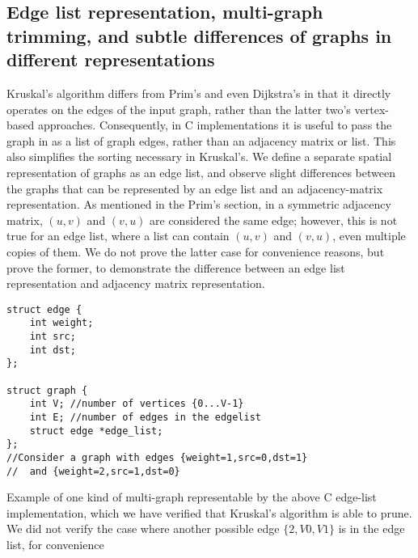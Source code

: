 \subsection{Edge list representation, multi-graph trimming, and subtle differences of graphs in different representations}
Kruskal's algorithm differs from Prim's and even Dijkstra's in that it directly operates on the edges of the input graph, rather than the latter two's vertex-based approaches. Consequently, in C implementations it is useful to pass the graph in as a list of graph edges, rather than an adjacency matrix or list. This also simplifies the sorting necessary in Kruskal's.
\newline\newline
We define a separate spatial representation of graphs as an edge list, and observe slight differences between the graphs that can be represented by an edge list and an adjacency-matrix representation. As mentioned in the Prim's section, in a symmetric adjacency matrix, $(u,v)$ and $(v,u)$ are considered the same edge; however, this is not true for an edge list, where a list can contain $(u,v)$ and $(v,u)$, even multiple copies of them. We do not prove the latter case for convenience reasons, but prove the former, to demonstrate the difference between an edge list representation and adjacency matrix representation.
\newline
\begin{lstlisting}
struct edge {
	int weight;
	int src;
	int dst;
};

struct graph {
	int V; //number of vertices {0...V-1}
	int E; //number of edges in the edgelist
	struct edge *edge_list;
};
//Consider a graph with edges {weight=1,src=0,dst=1}
//	and {weight=2,src=1,dst=0}
\end{lstlisting}
\begin{center}
\end{center}
\begin{center}
Example of one kind of multi-graph representable by the above C edge-list implementation, which we have verified that Kruskal's algorithm is able to prune. We did not verify the case where another possible edge $\{2,V0,V1\}$ is in the edge list, for convenience
\end{center}

